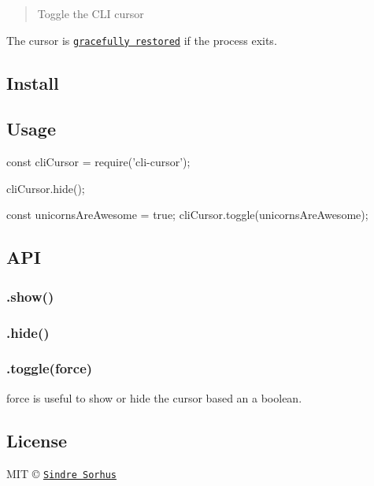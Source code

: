 \begin{quote}
Toggle the C\+LI cursor \end{quote}


The cursor is \href{https://github.com/sindresorhus/restore-cursor}{\tt gracefully restored} if the process exits.

\subsection*{Install}




\subsection*{Usage}


\begin{DoxyCode}
const cliCursor = require('cli-cursor');

cliCursor.hide();

const unicornsAreAwesome = true;
cliCursor.toggle(unicornsAreAwesome);
\end{DoxyCode}


\subsection*{A\+PI}

\subsubsection*{.show()}

\subsubsection*{.hide()}

\subsubsection*{.toggle(force)}

{\ttfamily force} is useful to show or hide the cursor based an a boolean.

\subsection*{License}

M\+IT © \href{http://sindresorhus.com}{\tt Sindre Sorhus} 